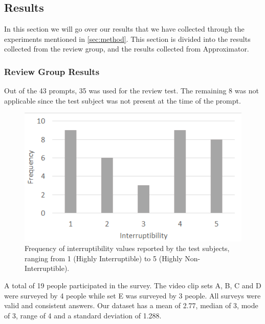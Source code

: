 \documentclass{sigchi}
\begin{document}
\subsection{Results}
In this section we will go over our results that we have collected through the experiments mentioned in \autoref{sec:method}.
This section is divided into the results collected from the review group, and the results collected from Approximator.

\subsubsection{Review Group Results}
Out of the 43 prompts, 35 was used for the review test.
The remaining 8 was not applicable since the test subject was not present at the time of the prompt.

\begin{figure}
  \centering
  \includegraphics[width=\columnwidth]{figures/Interruptibility_values_videotest.png}
  \caption{Frequency of interruptibility values reported by the test subjects, ranging from 1 (Highly Interruptible) to 5 (Highly Non-Interruptible).}
  \label{fig:interruptibilityFrequency}
\end{figure}

A total of 19 people participated in the survey.
The video clip sets A, B, C and D were surveyed by 4 people while set E was surveyed by 3 people.
All surveys were valid and consistent answers.
Our dataset has a mean of 2.77, median of 3, mode of 3, range of 4 and a standard deviation of 1.288.
\end{document}
